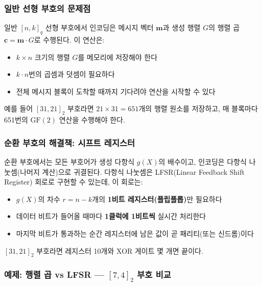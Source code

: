 \documentclass[
  oneside]{article}
\providecommand{\tightlist}{%
  \setlength{\itemsep}{0pt}\setlength{\parskip}{0pt}}
\begin{document}
\subsubsection{일반 선형 부호의
문제점}\label{uxc77cuxbc18-uxc120uxd615-uxbd80uxd638uxc758-uxbb38uxc81cuxc810}

일반 \([n, k]_q\) 선형 부호에서 인코딩은 메시지 벡터 \(\mathbf{m}\)과
생성 행렬 \(G\)의 행렬 곱 \(\mathbf{c} = \mathbf{m} \cdot G\)로
수행된다. 이 연산은:

\begin{itemize}
\tightlist
\item
  \(k \times n\) 크기의 행렬 \(G\)를 메모리에 저장해야 한다
\item
  \(k \cdot n\)번의 곱셈과 덧셈이 필요하다
\item
  전체 메시지 블록이 도착할 때까지 기다려야 연산을 시작할 수 있다
\end{itemize}

예를 들어 \([31, 21]_2\) 부호라면 \(21 \times 31 = 651\)개의 행렬 원소를
저장하고, 매 블록마다 651번의 \(\text{GF}(2)\) 연산을 수행해야 한다.

\subsubsection{순환 부호의 해결책: 시프트
레지스터}\label{uxc21cuxd658-uxbd80uxd638uxc758-uxd574uxacb0uxcc45-uxc2dcuxd504uxd2b8-uxb808uxc9c0uxc2a4uxd130}

순환 부호에서는 모든 부호어가 생성 다항식 \(g(X)\)의 배수이고, 인코딩은
다항식 나눗셈(나머지 계산)으로 귀결된다. 다항식 나눗셈은 LFSR(Linear
Feedback Shift Register) 회로로 구현할 수 있는데, 이 회로는:

\begin{itemize}
\tightlist
\item
  \(g(X)\)의 차수 \(r = n - k\)개의 \textbf{1비트 레지스터(플립플롭)}만
  필요하다
\item
  데이터 비트가 들어올 때마다 \textbf{1클럭에 1비트씩} 실시간 처리한다
\item
  마지막 비트가 통과하는 순간 레지스터에 남은 값이 곧 패리티(또는
  신드롬)이다
\end{itemize}

\([31, 21]_2\) 부호라면 레지스터 10개와 XOR 게이트 몇 개면 끝이다.

\subsubsection{\texorpdfstring{예제: 행렬 곱 vs LFSR --- \([7, 4]_2\)
부호
비교}{예제: 행렬 곱 vs LFSR --- {[}7, 4{]}\_2 부호 비교}}\label{uxc608uxc81c-uxd589uxb82c-uxacf1-vs-lfsr-7-4_2-uxbd80uxd638-uxbe44uxad50}
\end{document}
